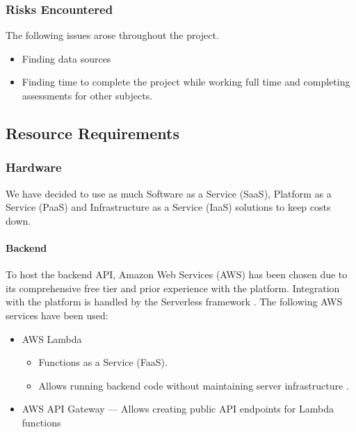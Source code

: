 \documentclass[a4paper,11pt]{article}
\begin{document}
\subsubsection{Risks Encountered}

The following issues arose throughout the project.

\begin{itemize}
  \item Finding data sources
  \item Finding time to complete the project while working full time and
    completing assessments for other subjects.
\end{itemize}

\subsection{Resource Requirements}

\subsubsection{Hardware}

We have decided to use as much Software as a Service (SaaS), Platform as a
Service (PaaS) and Infrastructure as a Service (IaaS) solutions to keep costs
down. \autocite[4]{project-spec:2}

\paragraph{Backend}

To host the backend API, Amazon Web Services (AWS) has been chosen due to its
comprehensive free tier and prior experience with the platform. Integration with
the platform is handled by the Serverless framework \autocite{serverless:3}. The
following AWS services have been used:

\begin{itemize}
  \item AWS Lambda
    \begin{itemize}
      \item Functions as a Service (FaaS).
      \item Allows running backend code without maintaining server
        infrastructure \autocite{aws:4}.
    \end{itemize}
  \item AWS API Gateway --- Allows creating public API endpoints for Lambda
    functions \autocite{aws:5}
\end{itemize}
\end{document}
